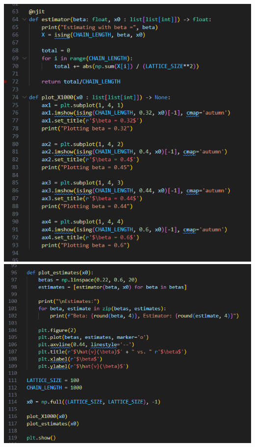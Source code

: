 \documentclass[11pt,letterpaper, leqno]{article}
\numberwithin{equation}{section}
\numberwithin{theorem}{section}
\numberwithin{lemma}{section}
\numberwithin{corollary}{section}
\numberwithin{definition}{section}
\numberwithin{proposition}{section}
\numberwithin{remark}{section}
\numberwithin{example}{section}
\begin{document}
\begin{center}
            \includegraphics[width=\textwidth]{Images/Code 3 - Estimator.png}
            \includegraphics[width=\textwidth]{Images/Code 4 - Plotting.png}
        \end{center}
    \color{black}
%

\end{document}
